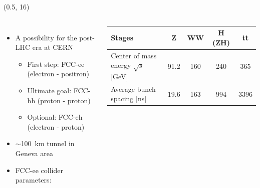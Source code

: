 \documentclass[final,xcolor={dvipsnames,svgnames,x11names,table}]{beamer}
\begin{document}
\begin{frame}
\begin{textblock}{44.5}(0.5, 16)
  \begin{tcolorbox}[title=The Future Circular Collider Experiment (FCC)]

  \begin{columns}
      \begin{itemize}
        \item A possibility for the post-LHC era at CERN \vspace{0.5cm}

          \begin{itemize}
            \item First step: FCC-ee (electron - positron)
            \item Ultimate goal: FCC-hh (proton - proton)
            \item Optional: FCC-eh (electron - proton) \vspace{0.5cm}
          \end{itemize}
        \item $\sim$100~km tunnel in Geneva area \vspace{0.5cm}
        \item FCC-ee collider parameters: \vspace{0.5cm}
      \end{itemize}
        \centering
      	\begin{tabular}{| l | c | c | c | c |}
        	\toprule
      	   Stages & Z & WW & H (ZH) & t\={t} \\
      	   \midrule
           Center of mass energy $\sqrt{s}$ [GeV] & 91.2 & 160 & 240 & 365 \\
           Average bunch spacing [ns] & 19.6 & 163 & 994 & 3396\\
      	   \bottomrule
      	\end{tabular}

    \vspace{0.5cm}


\end{columns}
\end{tcolorbox}
\end{textblock}
\end{frame}
\end{document}
